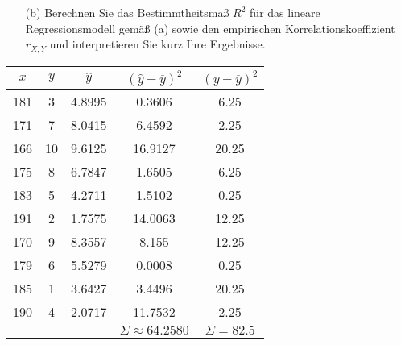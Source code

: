 \begin{task}
    \begin{enumerate}
        \item[(b)] Berechnen Sie das Bestimmtheitsmaß $R^2$ für das lineare Regressionsmodell gemäß (a) sowie den empirischen Korrelationskoeffizient $r_{X,Y}$ und interpretieren Sie kurz Ihre Ergebnisse.
    \end{enumerate}
\end{task}

\begin{table}[H]
\centering
\begin{tabular}{c|cc|cc}
    $x$ & $y$ & $\hat{y}$ & $(\hat{y} - \overline{y})^2$ & $(y-\overline{y})^2$ \\\hline
    181 &  3  & 4.8995    & 0.3606                       & 6.25                 \\
    171 &  7  & 8.0415    & 6.4592                       & 2.25                 \\
    166 & 10  & 9.6125    & 16.9127                      & 20.25                \\
    175 &  8  & 6.7847    & 1.6505                       & 6.25                 \\
    183 &  5  & 4.2711    & 1.5102                       & 0.25                 \\
    191 &  2  & 1.7575    & 14.0063                      & 12.25                \\
    170 &  9  & 8.3557    & 8.155                        & 12.25                \\
    179 &  6  & 5.5279    & 0.0008                       & 0.25                 \\
    185 &  1  & 3.6427    & 3.4496                       & 20.25                \\
    190 &  4  & 2.0717    & 11.7532                      & 2.25                 \\\hline
        &     &           & $\Sigma\approx64.2580$       & $\Sigma=82.5 $
\end{tabular}
\end{table}

\vspace{-1cm}


